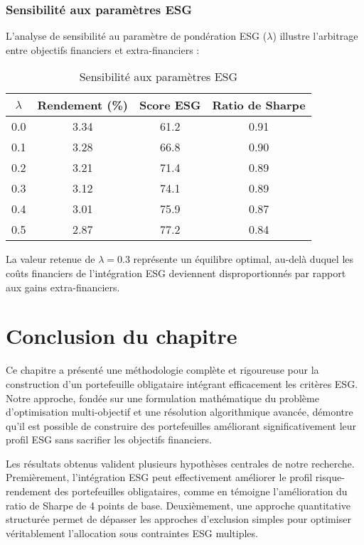 \subsubsection{Sensibilité aux paramètres ESG}

L'analyse de sensibilité au paramètre de pondération ESG ($\lambda$) illustre l'arbitrage entre objectifs financiers et extra-financiers :

\begin{table}[h!]
\centering
\begin{tabular}{cccc}
\hline
\textbf{$\lambda$} & \textbf{Rendement (\%)} & \textbf{Score ESG} & \textbf{Ratio de Sharpe} \\
\hline
0.0 & 3.34 & 61.2 & 0.91 \\
0.1 & 3.28 & 66.8 & 0.90 \\
0.2 & 3.21 & 71.4 & 0.89 \\
0.3 & 3.12 & 74.1 & 0.89 \\
0.4 & 3.01 & 75.9 & 0.87 \\
0.5 & 2.87 & 77.2 & 0.84 \\
\hline
\end{tabular}
\caption{Sensibilité aux paramètres ESG}
\end{table}

La valeur retenue de $\lambda = 0.3$ représente un équilibre optimal, au-delà duquel les coûts financiers de l'intégration ESG deviennent disproportionnés par rapport aux gains extra-financiers.

\section{Conclusion du chapitre}

Ce chapitre a présenté une méthodologie complète et rigoureuse pour la construction d'un portefeuille obligataire intégrant efficacement les critères ESG. Notre approche, fondée sur une formulation mathématique du problème d'optimisation multi-objectif et une résolution algorithmique avancée, démontre qu'il est possible de construire des portefeuilles améliorant significativement leur profil ESG sans sacrifier les objectifs financiers.

Les résultats obtenus valident plusieurs hypothèses centrales de notre recherche. Premièrement, l'intégration ESG peut effectivement améliorer le profil risque-rendement des portefeuilles obligataires, comme en témoigne l'amélioration du ratio de Sharpe de 4 points de base. Deuxièmement, une approche quantitative structurée permet de dépasser les approches d'exclusion simples pour optimiser véritablement l'allocation sous contraintes ESG multiples.


